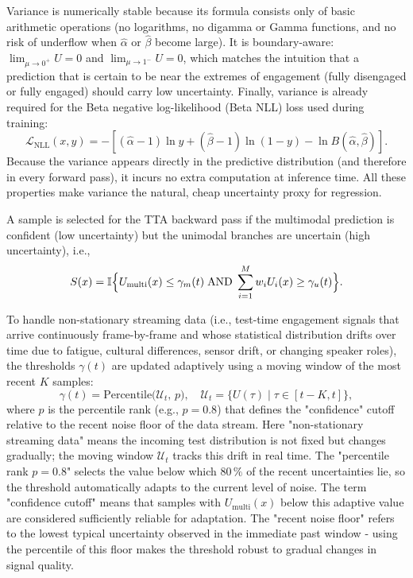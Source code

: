 \documentclass[11pt,a4paper]{article}
\begin{document}
	Variance is numerically stable because its formula consists only of basic arithmetic operations (no logarithms, no digamma or Gamma functions, and no risk of underflow when $\hat{\alpha}$ or $\hat{\beta}$ become large).  
	It is boundary-aware: $\lim_{\mu\to 0^+}U=0$ and $\lim_{\mu\to 1^-}U=0$, which matches the intuition that a prediction that is certain to be near the extremes of engagement (fully disengaged or fully engaged) should carry low uncertainty.  
	Finally, variance is already required for the Beta negative log-likelihood (Beta NLL) loss used during training:
	$$
	\mathcal{L}_{\text{NLL}}(x, y) = -[(\hat{\alpha}-1)\ln y + (\hat{\beta}-1)\ln(1-y) - \ln B(\hat{\alpha},\hat{\beta})].
	$$
	Because the variance appears directly in the predictive distribution (and therefore in every forward pass), it incurs no extra computation at inference time.  
	All these properties make variance the natural, cheap uncertainty proxy for regression.
	
	A sample is selected for the TTA backward pass if the multimodal prediction is confident (low uncertainty) but the unimodal branches are uncertain (high uncertainty), i.e.,
	$$
	S(x) = \mathbb{I}\Bigl\{ U_{\text{multi}}(x) \leq \gamma_m(t) \;\text{AND}\; \sum_{i=1}^M w_i U_i(x) \geq \gamma_u(t) \Bigr\}.
	$$
	
	To handle non-stationary streaming data (i.e., test-time engagement signals that arrive continuously frame-by-frame and whose statistical distribution drifts over time due to fatigue, cultural differences, sensor drift, or changing speaker roles), the thresholds $\gamma(t)$ are updated adaptively using a moving window of the most recent $K$ samples:
	$$
	\gamma(t) = \mathrm{Percentile}\bigl(\mathcal{U}_t,\, p\bigr), \quad
	\mathcal{U}_t = \bigl\{U(\tau) \mid \tau \in [t-K,t]\bigr\},
	$$
	where $p$ is the percentile rank (e.g., $p=0.8$) that defines the "confidence" cutoff relative to the recent noise floor of the data stream.  
	Here "non-stationary streaming data" means the incoming test distribution is not fixed but changes gradually; the moving window $\mathcal{U}_t$ tracks this drift in real time.  
	The "percentile rank $p=0.8$" selects the value below which $80\,\%$ of the recent uncertainties lie, so the threshold automatically adapts to the current level of noise.  
	The term "confidence cutoff" means that samples with $U_{\text{multi}}(x)$ below this adaptive value are considered sufficiently reliable for adaptation.  
	The "recent noise floor" refers to the lowest typical uncertainty observed in the immediate past window - using the percentile of this floor makes the threshold robust to gradual changes in signal quality.
	
\end{document}
